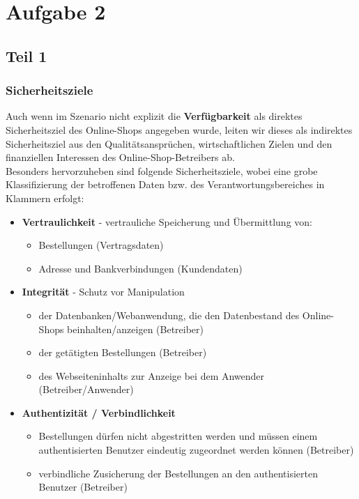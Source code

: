 \chapter{Aufgabe 2}

\section{Teil 1}

\subsection{Sicherheitsziele}

Auch wenn im Szenario nicht explizit die \textbf{Verfügbarkeit} als direktes Sicherheitsziel des Online-Shops angegeben wurde, leiten wir dieses als indirektes Sicherheitsziel aus den Qualitätsansprüchen, wirtschaftlichen Zielen und den finanziellen Interessen des Online-Shop-Betreibers ab.\\
Besonders hervorzuheben sind folgende Sicherheitsziele, wobei eine grobe Klassifizierung der betroffenen Daten bzw. des Verantwortungsbereiches in Klammern erfolgt:

\begin{itemize}
    \itemsep0.5em
    \item \textbf{Vertraulichkeit} - vertrauliche Speicherung und Übermittlung von:
    \begin{itemize}
        \item Bestellungen (Vertragsdaten)
        \item Adresse und Bankverbindungen (Kundendaten)
    \end{itemize}
    \item \textbf{Integrität} - Schutz vor Manipulation
    \begin{itemize}
        \item der Datenbanken/Webanwendung, die den Datenbestand des Online-Shops beinhalten/anzeigen (Betreiber)
        \item der getätigten Bestellungen (Betreiber)
        \item des Webseiteninhalts zur Anzeige bei dem Anwender (Betreiber/Anwender)
    \end{itemize}
    \item \textbf{Authentizität / Verbindlichkeit}
    \begin{itemize}
        \item Bestellungen dürfen nicht abgestritten werden und müssen einem authentisierten Benutzer eindeutig zugeordnet werden können (Betreiber)
        \item verbindliche Zusicherung der Bestellungen an den authentisierten Benutzer (Betreiber)
    \end{itemize}
\end{itemize}

